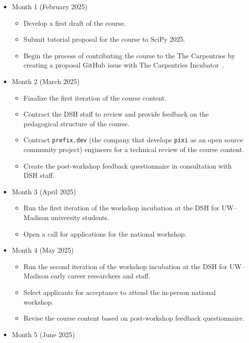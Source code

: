 \documentclass[letterpaper, 11pt]{article}
\newcommand{\institute}{UW--Madison}
\begin{document}
\begin{itemize}
  \item Month 1 (February 2025)
    \begin{itemize}
      \item Develop a first draft of the course.
      \item Submit tutorial proposal for the course to SciPy 2025.
      \item Begin the process of contributing the course to the The Carpentries by creating a proposal GitHub issue with The Carpentries Incubator~\cite{carpentries_incubator_proposals}.
    \end{itemize}
  \item Month 2 (March 2025)
    \begin{itemize}
      \item Finalize the first iteration of the course content.
      \item Contract the DSH staff to review and provide feedback on the pedagogical structure of the course.
      \item Contract \texttt{prefix.dev} (the company that develops \texttt{pixi} as an open source community project) engineers for a technical review of the course content.
      \item Create the post-workshop feedback questionnaire in consultation with DSH staff.
    \end{itemize}
  \item Month 3 (April 2025)
    \begin{itemize}
      \item Run the first iteration of the workshop incubation at the DSH for \institute{} university students.
      \item Open a call for applications for the national workshop.
    \end{itemize}
  \item Month 4 (May 2025)
    \begin{itemize}
      \item Run the second iteration of the workshop incubation at the DSH for \institute{} early career researchers and staff.
      \item Select applicants for acceptance to attend the in-person national workshop.
      \item Revise the course content based on post-workshop feedback questionnaire.
    \end{itemize}
  \item Month 5 (June 2025)
    \begin{itemize}

\end{itemize}
\end{itemize}
\end{document}
